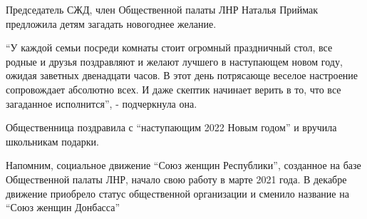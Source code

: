 Председатель СЖД, член Общественной палаты ЛНР Наталья Приймак предложила детям
загадать новогоднее желание.


\enquote{У каждой семьи посреди комнаты стоит огромный праздничный стол, все родные и
друзья поздравляют и желают лучшего в наступающем новом году, ожидая заветных
двенадцати часов. В этот день потрясающе веселое настроение сопровождает
абсолютно всех. И даже скептик начинает верить в то, что все загаданное
исполнится}, - подчеркнула она.

Общественница поздравила с \enquote{наступающим 2022 Новым годом} и вручила школьникам подарки.

Напомним, социальное движение \enquote{Союз женщин Республики}, созданное на базе
Общественной палаты ЛНР, начало свою работу в марте 2021 года. В декабре
движение приобрело статус общественной организации и сменило название на \enquote{Союз
женщин Донбасса}
